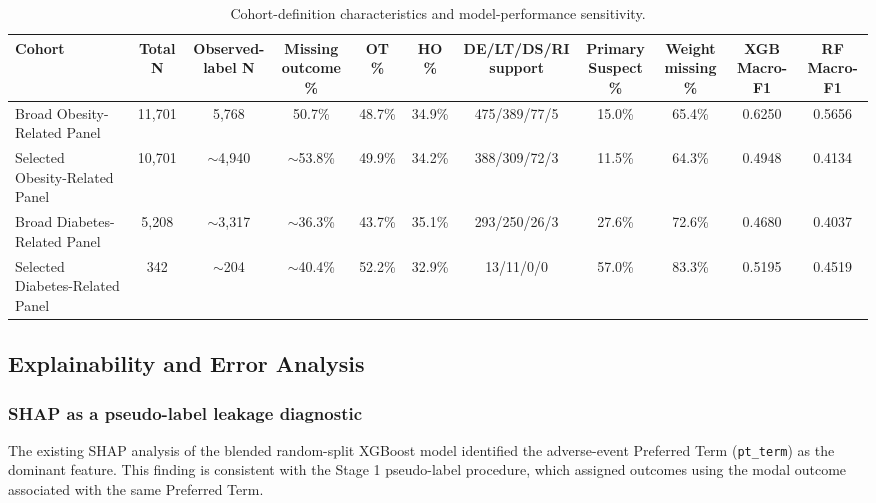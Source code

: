 \documentclass[10pt]{article}
\begin{document}
\begin{table}[htbp]
\caption{Cohort-definition characteristics and model-performance sensitivity.}
\label{tab:cohort_sensitivity}
\centering\small\setlength{\tabcolsep}{4pt}
\begin{tabularx}{\textwidth}{|X|c|c|c|c|c|c|c|c|c|c|}
\hline
\textbf{Cohort} & \textbf{Total N} & \makecell[c]{\textbf{Observed-}\\\textbf{label N}} & \makecell[c]{\textbf{Missing}\\\textbf{outcome \%}} & \textbf{OT \%} & \textbf{HO \%} & \makecell[c]{\textbf{DE/LT/DS/RI}\\\textbf{support}} & \makecell[c]{\textbf{Primary}\\\textbf{Suspect \%}} & \makecell[c]{\textbf{Weight}\\\textbf{missing \%}} & \makecell[c]{\textbf{XGB}\\\textbf{Macro-F1}} & \makecell[c]{\textbf{RF}\\\textbf{Macro-F1}} \\
\hline
Broad Obesity-Related Panel & 11{,}701 & 5{,}768 & 50.7\% & 48.7\% & 34.9\% & 475/389/77/5 & 15.0\% & 65.4\% & 0.6250 & 0.5656 \\
\hline
Selected Obesity-Related Panel & 10{,}701 & $\sim$4{,}940 & $\sim$53.8\% & 49.9\% & 34.2\% & 388/309/72/3 & 11.5\% & 64.3\% & 0.4948 & 0.4134 \\
\hline
Broad Diabetes-Related Panel & 5{,}208 & $\sim$3{,}317 & $\sim$36.3\% & 43.7\% & 35.1\% & 293/250/26/3 & 27.6\% & 72.6\% & 0.4680 & 0.4037 \\
\hline
Selected Diabetes-Related Panel & 342 & $\sim$204 & $\sim$40.4\% & 52.2\% & 32.9\% & 13/11/0/0 & 57.0\% & 83.3\% & 0.5195 & 0.4519 \\
\hline
\end{tabularx}
\end{table}

\subsection{Explainability and Error Analysis}

\subsubsection{SHAP as a pseudo-label leakage diagnostic}
The existing SHAP analysis of the blended random-split XGBoost model identified the adverse-event Preferred Term (\texttt{pt\_term}) as the dominant feature. This finding is consistent with the Stage 1 pseudo-label procedure, which assigned outcomes using the modal outcome associated with the same Preferred Term. 
\end{document}
